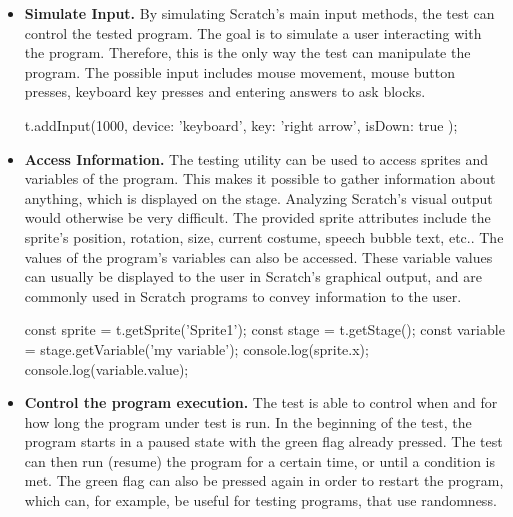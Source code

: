\begin{itemize}
    \item \textbf{Simulate Input.}
        By simulating Scratch's main input methods, the test can control the tested program.
        The goal is to simulate a user interacting with the program.
        Therefore, this is the only way the test can manipulate the program.
        The possible input includes mouse movement, mouse button presses, keyboard key presses and entering answers to ask blocks.
        \begin{javascriptcode}
            t.addInput(1000, {
                device: 'keyboard',
                key: 'right arrow',
                isDown: true
            });
        \end{javascriptcode}
    \item \textbf{Access Information.}
        The testing utility can be used to access sprites and variables of the program.
        This makes it possible to gather information about anything, which is displayed on the stage.
        Analyzing Scratch's visual output would otherwise be very difficult.
        The provided sprite attributes include the sprite's position, rotation, size, current costume, speech bubble text, etc..
        The values of the program's variables can also be accessed.
        These variable values can usually be displayed to the user in Scratch's graphical output, and are commonly used in Scratch programs to convey information to the user.
        \begin{javascriptcode}
            const sprite = t.getSprite('Sprite1');
            const stage = t.getStage();
            const variable = stage.getVariable('my variable');
            console.log(sprite.x);
            console.log(variable.value);
        \end{javascriptcode}
    \item \textbf{Control the program execution.}
        The test is able to control when and for how long the program under test is run.
        In the beginning of the test, the program starts in a paused state with the green flag already pressed.
        The test can then run (resume) the program for a certain time, or until a condition is met.
        The green flag can also be pressed again in order to restart the program, which can, for example, be useful for testing programs, that use randomness.
        \begin{javascriptcode}

\end{javascriptcode}
\end{itemize}
